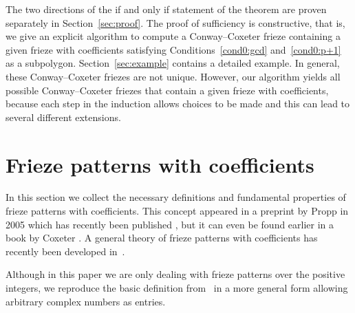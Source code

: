\documentclass[ALCO,ThmDefs,Unicode,epreuves,published]{cedram}
\numberwithin{equation}{section}
\begin{document}
The two directions of the if and only if statement of the
theorem are proven separately in Section~\ref{sec:proof}. The proof of
sufficiency is constructive, that is, we give an explicit algorithm to
compute a Conway--Coxeter frieze containing a given frieze with coefficients
satisfying Conditions~\eqref{cond0:gcd} and~\eqref{cond0:p+1} as a subpolygon. 
Section~\ref{sec:example} contains a detailed example. 
In general, these Conway--Coxeter friezes are not unique. However, 
our algorithm yields all possible Conway--Coxeter friezes that contain a 
given frieze with coefficients, because each step in the induction 
allows choices to be made and this can lead to 
several different extensions.

\section{Frieze patterns with coefficients}
\label{sec:definition}

In this section we collect the necessary definitions and fundamental properties
of frieze patterns with coefficients. This concept appeared in a preprint by Propp in 2005 which has recently been published
\cite{Propp}, but it can even be found earlier in a book by Coxeter
\cite{Cox91}. A general theory of frieze patterns with
coefficients has recently been developed in~\cite{CHJ}. 

Although in this paper we are only dealing with frieze patterns over the positive integers, 
we reproduce the basic definition from~\cite{CHJ} in a more
general form allowing arbitrary complex numbers as entries. 
\end{document}
